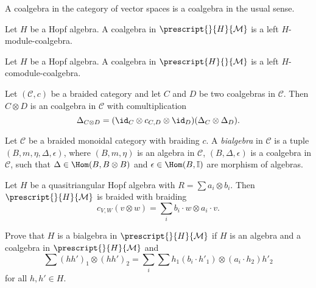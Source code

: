 \documentclass[12pt]{amsproc}
\newcommand{\lmod}[1]{\prescript{}{#1}{\mathcal{M}}}
\newcommand{\lcomod}[1]{\prescript{#1}{}{\mathcal{M}}}
\begin{document}
\begin{example}
A coalgebra in the category of vector spaces 
is a coalgebra in the usual sense.
\end{example}

\begin{example}
Let $H$ be a Hopf algebra. 
A coalgebra in $\lmod{H}$ is a left $H$-module-coalgebra.
\end{example}


\begin{example}
Let $H$ be a Hopf algebra. 
A coalgebra in $\lcomod{H}$ 
is a left $H$-comodule-coalgebra.
\end{example}

\begin{example}
Let $(\mathcal{C},c)$ be a braided category and let $C$ and $D$ be two
coalgebras in $\mathcal{C}$. Then $C\otimes D$ is an coalgebra in $\mathcal{C}$
with comultiplication 
\[
\Delta_{C\otimes D}=(\id_C\otimes c_{C,D}\otimes \id_D)(\Delta_C\otimes\Delta_D).
\]
\end{example}

\begin{definition}
Let $\mathcal{C}$ be a braided monoidal category with braiding $c$.
A \emph{bialgebra} in $\mathcal{C}$ is a tuple $(B,m,\eta,\Delta,\epsilon)$,
where $(B,m,\eta)$ is an algebra in $\mathcal{C}$, $(B,\Delta,\epsilon)$
is a coalgebra in $\mathcal{C}$, such that $\Delta\in\Hom(B,B\otimes B)$
and $\epsilon\in\Hom(B,\mathbb{I})$ are morphism of algebras.
\end{definition}


\begin{exercise}
Let $H$ be a quasitriangular Hopf algebra with $R=\sum a_{i}\otimes b_{i}$.
Then $\lmod{H}$ is braided with braiding
\[
c_{V,W}(v\otimes w)=\sum_{i}b_{i}\cdot w\otimes a_{i}\cdot v.
\]
\end{exercise}

\begin{exercise}
    Prove that $H$ is a bialgebra in $\lmod{H}$ if $H$ is an algebra
and a coalgebra in $\lmod{H}$ and 
\[
\sum (hh')_{1}\otimes(hh')_{2}=\sum_{i}\sum h_{1}(b_{i}\cdot h'_{1})\otimes(a_{i}\cdot h_{2})h'_{2}
\]
for all $h,h'\in H$.
\end{exercise}
\end{document}

